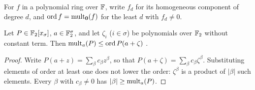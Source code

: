 For \(f\) in a polynomial ring over \(\mathbb F\), write \(f_d\) for its homogeneous
component of degree \(d\), and \(\operatorname{ord}f=\operatorname{mult}_{\mathbf 0}(f)\) for the least
\(d\) with \(f_d\ne0\).

\begin{lemma}[Substitution]\label{lem:substitution}
Let \(P\in\mathbb F_2[x_\sigma]\), \(a\in\mathbb F_2^\sigma\), and let \(\zeta_i\) (\(i\in\sigma\)) be
polynomials over \(\mathbb F_2\) without constant term. Then
\(\operatorname{mult}_a(P)\le\operatorname{ord}P(a+\zeta)\)
.
\end{lemma}

\begin{proof}
Write \(P(a+z)=\sum_\beta c_\beta z^\beta\), so that \(P(a+\zeta)=\sum_\beta
c_\beta\zeta^\beta\). Substituting elements of order at least one does not lower the
order: \(\zeta^\beta\) is a product of \(|\beta|\) such elements. Every \(\beta\) with
\(c_\beta\ne0\) has \(|\beta|\ge\operatorname{mult}_a(P)\).
\end{proof}
